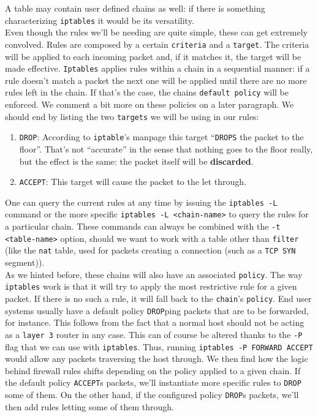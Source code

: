             A table may contain user defined chains as well: if there is something characterizing \texttt{iptables} it would be its versatility.\\

            Even though the rules we'll be needing are quite simple, these can get extremely convolved. Rules are composed by a certain \texttt{criteria} and a \texttt{target}. The criteria will be applied to each incoming packet and, if it matches it, the target will be made effective. \texttt{Iptables} applies rules within a chain in a sequential manner: if a rule doesn't match a packet the next one will be applied until there are no more rules left in the chain. If that's the case, the chains \texttt{default policy} will be enforced. We comment a bit more on these policies on a later paragraph. We should end by listing the two \texttt{targets} we will be using in our rules:\\

            \begin{enumerate}
                \item \texttt{DROP}: According to \texttt{iptable}'s manpage this target ``\texttt{DROPS} the packet to the floor''. That's not ``accurate'' in the sense that nothing goes to the floor really, but the effect is the same: the packet itself will be \textbf{discarded}.
                \item \texttt{ACCEPT}: This target will cause the packet to the let through.
            \end{enumerate}

            One can query the current rules at any time by issuing the \texttt{iptables -L} command or the more specific \texttt{iptables -L <chain-name>} to query the rules for a particular chain. These commands can always be combined with the \texttt{-t <table-name>} option, should we want to work with a table other than \texttt{filter} (like the \texttt{nat} table, used for packets creating a connection (such as a \texttt{TCP SYN} segment)).\\

            As we hinted before, these chains will also have an associated \texttt{policy}. The way \texttt{iptables} work is that it will try to apply the most restrictive rule for a given packet. If there is no such a rule, it will fall back to the \texttt{chain}'s \texttt{policy}. End user systems usually have a default policy \texttt{DROP}ping packets that are to be forwarded, for instance. This follows from the fact that a normal host should not be acting as a \texttt{layer 3} router in any case. This can of course be altered thanks to the \texttt{-P} flag that we can use with \texttt{iptables}. Thus, running \texttt{iptables -P FORWARD ACCEPT} would allow any packets traversing the host through. We then find how the logic behind firewall rules shifts depending on the policy applied to a given chain. If the default policy \texttt{ACCEPT}s packets, we'll instantiate more specific rules to \texttt{DROP} some of them. On the other hand, if the configured policy \texttt{DROP}s packets, we'll then add rules letting some of them through.\\

